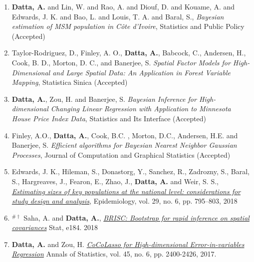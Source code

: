 \documentclass[11pt,a4paper,sans]{moderncv} %
\begin{document}
{\begin{enumerate}
\item \vskip 4mm \textbf{Datta, A.} and Lin, W. and Rao, A. and Diouf, D. and Kouame, A. and Edwards, J. K. and Bao, L. and Louis, T. A. and Baral, S., {\em Bayesian estimation of MSM population in C{\^o}te d'Ivoire}, Statistics and Public Policy (Accepted)

\item \vskip 4mm Taylor-Rodriguez, D., Finley, A. O.,  \textbf{Datta, A.}, Babcock, C., Andersen, H., Cook, B. D., Morton, D. C.,  and Banerjee, S. {\em Spatial Factor Models for High-Dimensional and Large Spatial Data: An Application in Forest Variable Mapping}, Statistica Sinica (Accepted)
	
\item \vskip 4mm \textbf{Datta, A.}, Zou, H. and Banerjee, S. {\em Bayesian Inference for High-dimensional Changing Linear Regression with Application to Minnesota House Price Index Data}, Statistics and Its Interface (Accepted)
	
\item \vskip 4mm Finley, A.O., \textbf{Datta, A.}, Cook, B.C. ,  Morton, D.C., Andersen, H.E. and Banerjee, S. {\em Efficient algorithms for Bayesian Nearest Neighbor Gaussian Processes}, Journal of Computation and Graphical Statistics (Accepted)	
	
\item \vskip 4mm Edwards, J. K., Hileman, S., Donastorg, Y., Sanchez, R., Zadrozny, S., Baral, S., Hargreaves, J., Fearon, E., Zhao, J., \textbf{Datta, A.} and Weir, S. S.,  {\em \href{https://journals.lww.com/epidem/Fulltext/2018/11000/Estimating_Sizes_of_Key_Populations_at_the.7.aspx}{Estimating sizes of key populations at the national level: considerations for study design and analysis}}, Epidemiology, vol. 29,  no. 6, pp. 795--803, 2018

\item \vskip 4mm $^{\# \dagger}$ Saha, A. and \textbf{Datta, A.}, \href{https://onlinelibrary.wiley.com/doi/abs/10.1002/sta4.184}{\em BRISC: Bootstrap for rapid inference on spatial covariances} Stat, e184. 2018

\item \vskip 4mm \textbf{Datta, A.} and Zou, H. \href{https://projecteuclid.org/euclid.aos/1513328577}{\em CoCoLasso for High-dimensional Error-in-variables Regression} Annals of Statistics, vol. 45, no. 6, pp. 2400-2426, 2017.


\end{enumerate}}
\end{document}
